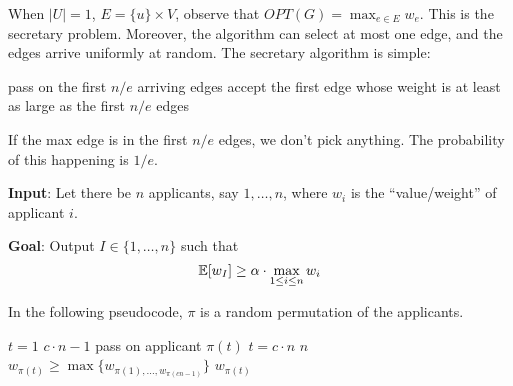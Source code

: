 When $|U| = 1$, $E = \{u\} \times V$, observe that $OPT(G) = \max_{e \in E} w_e$. This is the secretary problem. Moreover, the algorithm can select at most one edge, and the edges arrive uniformly at random. The secretary algorithm is simple:

\begin{codebox}
    \li pass on the first $n / e$ arriving edges
    \li accept the first edge whose weight is at least as large as the first $n / e$ edges
\end{codebox}

If the max edge is in the first $n / e$ edges, we don't pick anything. The probability of this happening is $1 / e$.

\begin{problem}
    \hfill
    
    \normalfont \textbf{Input}: Let there be $n$ applicants, say $1,\ldots,n$, where $w_i$ is the ``value/weight'' of applicant $i$.

    \textbf{Goal}: Output $I \in \{1,\ldots,n\}$ such that
    $$
    \mathbb{E}[w_I] \geq \alpha \cdot \max_{1 \leq i \leq n} w_i
    $$
\end{problem}

In the following pseudocode, $\pi$ is a random permutation of the applicants.

\begin{codebox}
    \li \For $t = 1$ \To $c\cdot n - 1$ \Do
        \li pass on applicant $\pi(t)$
    \End
    \li \For $t = c \cdot n$ \To $n$ \Do
        \li \If $w_{\pi(t)} \geq \max \{w_{\pi(1),\ldots,w_{\pi(cn-1)}}\}$ \Then
            \li \Return $w_{\pi(t)}$
\end{codebox}

